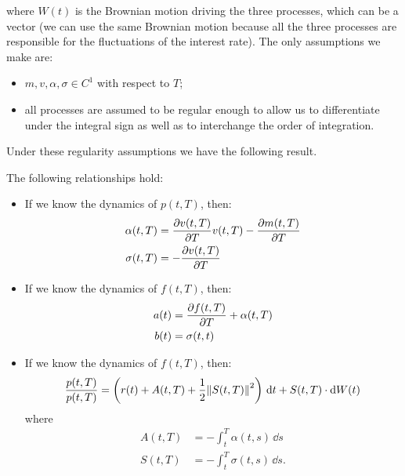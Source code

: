 where $W(t)$ is the Brownian motion driving the three processes, which can be a vector (we can use the same Brownian motion because all the three processes are responsible for the fluctuations of the interest rate). The only assumptions we make are:
\begin{itemize}
    \item $m, v, \alpha, \sigma \in C^1$ with respect to $T$;
    \item all processes are assumed to be regular enough to allow us to differentiate under the integral sign as well as to interchange the order of integration.
\end{itemize}
Under these regularity assumptions we have the following result.
\begin{theorem}
    The following relationships hold:
    \begin{itemize}
        \item If we know the dynamics of $p(t,T)$, then:
        \begin{align}
            \alpha(t,T) &= \pdv{v(t,T)}{T}v(t,T) - \pdv{m(t,T)}{T} \\
            \sigma(t,T) &= -\pdv{v(t,T)}{T}
        \end{align}
        \item If we know the dynamics of $f(t,T)$, then:
        \begin{align}
            a(t) &= \pdv{f(t,T)}{T} + \alpha(t,T) \\
            b(t) &= \sigma(t,t)
        \end{align}
        \item If we know the dynamics of $f(t,T)$, then:
        \begin{align}
            \frac{p(t,T)}{p(t,T)} = \left(r(t) + A(t,T) + \frac{1}{2}\norm{S(t,T)}^2\right)\,\dd t + S(t,T)\cdot \dd W(t)
        \end{align}
        where
        \begin{align}
            A(t,T) &= -\int_t^T \alpha(t,s)\,\dd s \\
            S(t,T) &= -\int_t^T \sigma(t,s)\,\dd s.
        \end{align}
    \end{itemize}
\end{theorem}
